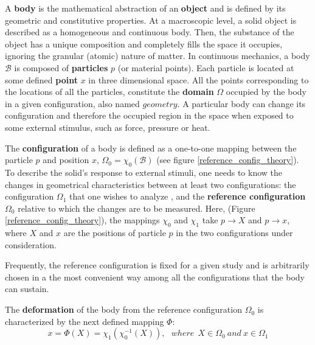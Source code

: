 	A \textbf{body} is the mathematical abstraction of an \textbf{object} and is defined by its geometric and constitutive properties.  At a macroscopic level, a solid object is described as a homogeneous and continuous body. Then, the substance of the object has a unique composition and completely fills the space it occupies, ignoring the granular (atomic) nature of matter. In continuous mechanics, a body $\mathcal{B}$ is composed of \textbf{particles} $p$  (or material points). Each particle is located at some defined \textbf{point}  $x$ in three dimensional space. All the points corresponding to the locations of all the particles, constitute the \textbf{domain} $\Omega$  occupied by the body in a given configuration, also named $geometry$. A particular body can change its configuration and therefore the occupied region in the space when exposed to some external stimulus, such as force, pressure or heat.
	
 The \textbf{configuration} of a body is defined as a one-to-one mapping between the particle $p$ and position $x$, $\Omega_0 = \chi_0 (\mathcal{B})$ (see figure \ref{reference_config_theory}). To describe the solid's response to external stimuli, one needs to know the changes in geometrical characteristics between at least two configurations: the configuration $\Omega_1$ that one wishes to analyze  , and the \textbf{reference configuration} $\Omega_0$  relative to which the changes are to be measured. Here, (Figure \ref{reference_config_theory}), the mappings $\chi_0$ and $\chi_1$ take $p \rightarrow X$ and $p \rightarrow x$, where $X$ and $x$ are the positions of particle $p$ in the two configurations under consideration.

Frequently, the reference configuration is fixed for a given study and is arbitrarily chosen in a the most convenient way among all the configurations that the body can sustain. 
 
 The \textbf{deformation} of the body from the reference configuration $\Omega_0$ is characterized by the next defined mapping $\Phi$:
 \begin{equation} 
 x = \Phi(X) = \chi_1(\chi_0^{-1}(X)), \ \ \  where \ \  X \in \Omega_0 \ and \ x \in \Omega_1
 \label{referenceToCurrentCoordinates}
 \end{equation}
 
